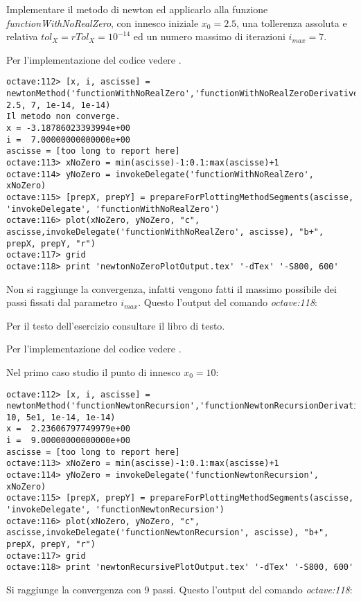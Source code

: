 \begin{exercise}
Implementare il metodo di newton ed applicarlo alla funzione \emph{functionWithNoRealZero},
con innesco iniziale $x_{0} = 2.5$, una tollerenza assoluta e relativa
$tol_{X} = rTol_{X} = 10^{-14}$ ed un numero massimo di iterazioni
$i_{max} = 7$.
\end{exercise}
Per l'implementazione del codice vedere .
\begin{lstlisting}
octave:112> [x, i, ascisse] = newtonMethod('functionWithNoRealZero','functionWithNoRealZeroDerivative', 2.5, 7, 1e-14, 1e-14)
Il metodo non converge.
x = -3.18786023393994e+00
i =  7.00000000000000e+00
ascisse = [too long to report here]
octave:113> xNoZero = min(ascisse)-1:0.1:max(ascisse)+1
octave:114> yNoZero = invokeDelegate('functionWithNoRealZero', xNoZero)
octave:115> [prepX, prepY] = prepareForPlottingMethodSegments(ascisse, 'invokeDelegate', 'functionWithNoRealZero')
octave:116> plot(xNoZero, yNoZero, "c", ascisse,invokeDelegate('functionWithNoRealZero', ascisse), "b+", prepX, prepY, "r")
octave:117> grid
octave:118> print 'newtonNoZeroPlotOutput.tex' '-dTex' '-S800, 600'
\end{lstlisting}
Non si raggiunge la convergenza, infatti vengono fatti il massimo possibile
dei passi fissati dal parametro $i_{max}$. Questo l'output del comando \emph{octave:118}:
\begin{center}

\end{center}

\begin{exercise}[2.4]
Per il testo dell'esercizio consultare il libro di testo.
\end{exercise}
Per l'implementazione del codice vedere .

Nel primo caso studio il punto di innesco $x_{0} = 10$:
\begin{lstlisting}
octave:112> [x, i, ascisse] = newtonMethod('functionNewtonRecursion','functionNewtonRecursionDerivative', 10, 5e1, 1e-14, 1e-14)
x =  2.23606797749979e+00
i =  9.00000000000000e+00
ascisse = [too long to report here]
octave:113> xNoZero = min(ascisse)-1:0.1:max(ascisse)+1
octave:114> yNoZero = invokeDelegate('functionNewtonRecursion', xNoZero)
octave:115> [prepX, prepY] = prepareForPlottingMethodSegments(ascisse, 'invokeDelegate', 'functionNewtonRecursion')
octave:116> plot(xNoZero, yNoZero, "c", ascisse,invokeDelegate('functionNewtonRecursion', ascisse), "b+", prepX, prepY, "r")
octave:117> grid
octave:118> print 'newtonRecursivePlotOutput.tex' '-dTex' '-S800, 600'
\end{lstlisting}
Si raggiunge la convergenza con 9 passi. Questo l'output del comando
\emph{octave:118}:
\begin{center}

\end{center}

